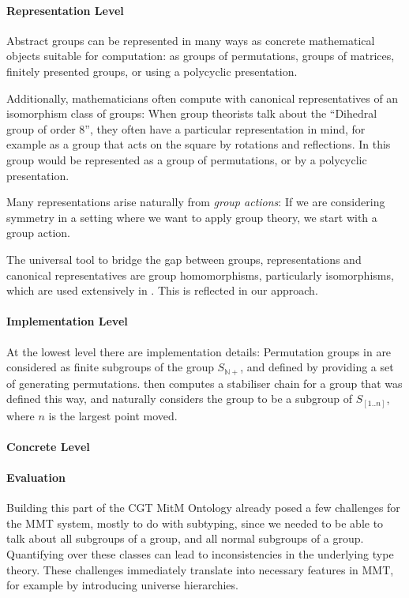 \paragraph{Representation Level} 
Abstract groups can be represented in many ways as concrete mathematical
objects suitable for computation: as groups of permutations, groups of matrices,
finitely presented groups, or using a polycyclic presentation.

Additionally, mathematicians often compute with canonical representatives of an isomorphism class of groups: When group theorists talk about the ``Dihedral group of order 8'', they often have a particular representation in mind, for example as a group that acts on the square by rotations and reflections. 
In \GAP this group would be represented as a group of permutations, or by a polycyclic presentation.

Many representations arise naturally from \emph{group actions}: If we are
considering symmetry in a setting where we want to apply group theory, we start
with a group action.

The universal tool to bridge the gap between groups, representations and
canonical representatives are group homomorphisms, particularly isomorphisms,
which are used extensively in \GAP. This is reflected in our approach.

\paragraph{Implementation Level}
At the lowest level there are implementation details: Permutation groups in \GAP
are considered as finite subgroups of the group $S_{\mathbb{N}+}$, and defined by
providing a set of generating permutations. \GAP then computes a stabiliser chain
for a group that was defined this way, and naturally considers the group to be a
subgroup of $S_{[1..n]}$, where $n$ is the largest point moved.

\paragraph{Concrete Level}

\paragraph{Evaluation}
Building this part of the CGT MitM Ontology already posed a few challenges for
the MMT system, mostly to do with subtyping, since we needed to be able to talk
about all subgroups of a group, and all normal subgroups of a group. Quantifying
over these classes can lead to inconsistencies in the underlying type theory.
These challenges immediately translate into necessary
features in MMT, for example by introducing universe hierarchies.

